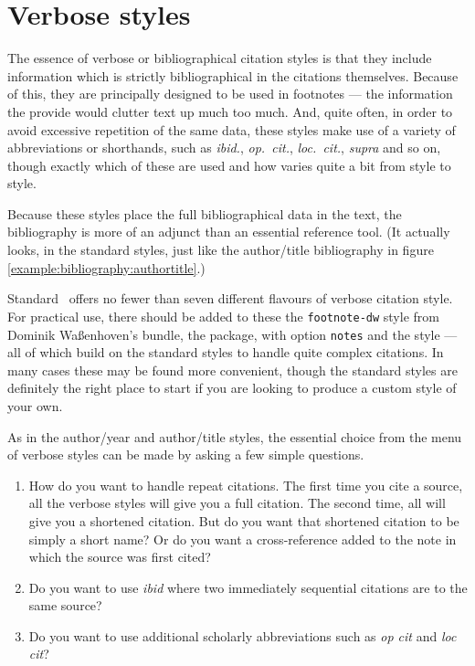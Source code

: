 \section{Verbose styles}

The essence of verbose or bibliographical citation styles is that they
include information which is strictly bibliographical in the citations
themselves. Because of this, they are principally designed to be used
in footnotes --- the information the provide would clutter text up
much too much. And, quite often, in order to avoid excessive
repetition of the same data, these styles make use of a variety of
abbreviations or shorthands, such as \emph{ibid.}, \emph{op.\ cit.},
\emph{loc.\ cit.}, \emph{supra} and so on, though exactly which of
these are used and how varies quite a bit from style to style.

Because these styles place the full bibliographical data in the text,
the bibliography is more of an adjunct than an essential reference
tool. (It actually looks, in the standard styles, just like the
author/title bibliography in figure
\ref{example:bibliography:authortitle}.)

Standard \biblatex\ offers no fewer than seven
different flavours of verbose citation style. For practical use, there
should be added to these the \verb|footnote-dw| style from Dominik
Waßenhoven's  bundle, the
 package, with option \verb|notes| and the
 style --- all of which build on the standard styles
to handle quite complex citations. In many cases these may be found
more convenient, though the standard styles are definitely the right
place to start if you are looking to produce a custom style of your
own.

As in the author/year and author/title styles, the essential choice
from the menu of verbose styles can be made by asking a few simple
questions.
\begin{enumerate}
\item How do you want to handle repeat citations. The first time you
  cite a source, all the verbose styles will give you a full
  citation. The second time, all will give you a shortened
  citation. But do you want that shortened citation to be simply a
  short name? Or do you want a cross-reference added to the note in
  which the source was first cited?
\item Do you want to use \emph{ibid} where two immediately sequential
  citations are to the same source?
\item Do you want to use additional scholarly abbreviations such as
  \emph{op cit} and \emph{loc cit}?
\end{enumerate}

